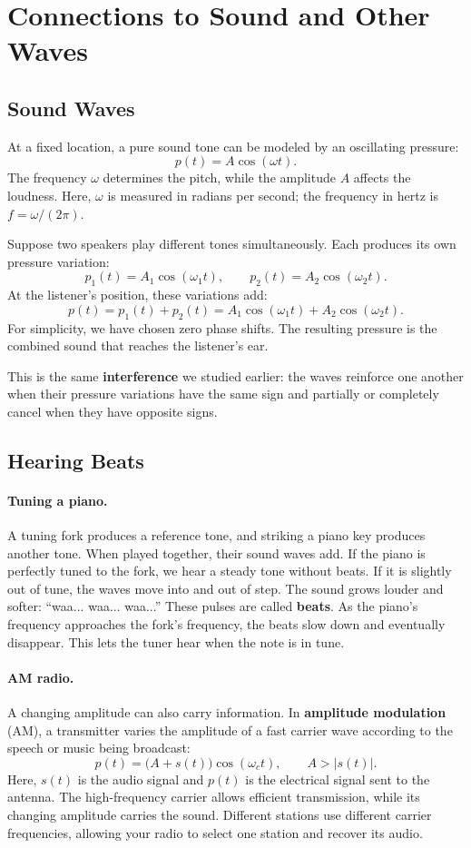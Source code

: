 \documentclass[10pt,letterpaper]{article}
\begin{document}
\section{Connections to Sound and Other Waves}

\subsection{Sound Waves}

At a fixed location, a pure sound tone can be modeled
by an oscillating pressure:
\[
p(t)=A\cos(\omega t).
\]
The frequency $\omega$ determines the pitch, while the amplitude $A$
affects the loudness. Here, $\omega$ is measured in
radians per second; the frequency in hertz is
$f=\omega/(2\pi)$.

Suppose two speakers play different tones simultaneously.
Each produces its own pressure variation:
\[
p_1(t)=A_1\cos(\omega_1t),
\qquad
p_2(t)=A_2\cos(\omega_2t).
\]
At the listener's position, these variations add:
\[
p(t)=p_1(t)+p_2(t)
=A_1\cos(\omega_1t)+A_2\cos(\omega_2t).
\]
For simplicity, we have chosen zero phase shifts.
The resulting pressure is the combined sound that
reaches the listener's ear.

This is the same \textbf{interference} we studied earlier:
the waves reinforce one another when their pressure
variations have the same sign and partially or completely
cancel when they have opposite signs.
\subsection{Hearing Beats}

\paragraph{Tuning a piano.}
A tuning fork produces a reference tone, and striking
a piano key produces another tone. When played together,
their sound waves add. If the piano is perfectly tuned
to the fork, we hear a steady tone without beats.
If it is slightly out of tune, the waves move into
and out of step. The sound grows louder and softer:
``waa... waa... waa...''
These pulses are called \textbf{beats}.
As the piano's frequency approaches the fork's frequency,
the beats slow down and eventually disappear.
This lets the tuner hear when the note is in tune.

\paragraph{AM radio.}
A changing amplitude can also carry information.
In \textbf{amplitude modulation} (AM), a transmitter
varies the amplitude of a fast carrier wave according
to the speech or music being broadcast:
\[
p(t)=\bigl(A+s(t)\bigr)\cos(\omega_c t),
\qquad A>|s(t)|.
\]
Here, $s(t)$ is the audio signal and $p(t)$ is the
electrical signal sent to the antenna. The high-frequency
carrier allows efficient transmission, while its changing
amplitude carries the sound. Different stations use
different carrier frequencies, allowing your radio
to select one station and recover its audio.
\end{document}
